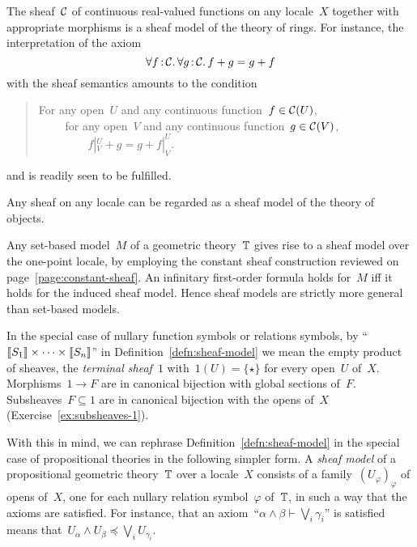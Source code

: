 \documentclass{ws-rv9x6}
\begin{document}
{\begin{example}The sheaf~$\mathcal{C}$ of continuous real-valued functions on any
locale~$X$ together with appropriate morphisms is a sheaf model of the theory
of rings. For instance, the interpretation of the axiom
\[ \forall f\,{:}\,\mathcal{C}\mathpunct{.} \forall g\,{:}\,\mathcal{C}\mathpunct{.} f + g = g + f \]
with the sheaf semantics amounts to the condition
\begin{quote}
For any open~$U$ and any continuous function~$f \in \mathcal{C}(U)$, \\
${\qquad}$ for any open~$V$ and any continuous function~$g \in \mathcal{C}(V)$, \\
${\qquad\qquad}$ $f|^U_V + g = g + f|^U_V$.
\end{quote}
and is readily seen to be fulfilled.
\end{example}

\begin{example}Any sheaf on any locale can be
regarded as a sheaf model of the theory of objects.\end{example}

\begin{example}\label{ex:sets-as-sheaf-models}
Any set-based model~$M$ of a geometric theory~$\mathbb{T}$ gives rise to a
sheaf model over the one-point locale, by employing the constant sheaf
construction reviewed on page~\ref{page:constant-sheaf}. An infinitary
first-order formula holds for~$M$ iff it holds for the induced sheaf model.
Hence sheaf models are strictly more general than set-based models.
\end{example}

In the special case of nullary function symbols or relations symbols, by
``${\llbracket{S_1}\rrbracket} \times \cdots \times {\llbracket{S_n}\rrbracket}$'' in
Definition~\ref{defn:sheaf-model} we mean the empty product of sheaves, the
\emph{terminal sheaf}~$1$ with~$1(U) = \{\star\}$ for every open~$U$ of~$X$.
Morphisms~$1 \to F$ are in canonical bijection with global sections of~$F$.
Subsheaves~$F \subseteq 1$ are in canonical bijection with the opens of~$X$
(Exercise~\ref{ex:subsheaves-1}).

With this in mind, we can rephrase Definition~\ref{defn:sheaf-model} in the
special case of propositional theories in the following simpler form. A
\emph{sheaf model} of a propositional geometric theory~$\mathbb{T}$ over a locale~$X$
consists of a family~$(U_\varphi)_\varphi$ of opens of~$X$, one for each
nullary relation symbol~$\varphi$ of~$\mathbb{T}$, in such a way that the axioms are
satisfied. For instance, that an axiom~``$\alpha \wedge \beta \vdash \bigvee_i
\gamma_i$'' is satisfied means that~$U_\alpha \wedge U_\beta \preceq \bigvee_i
U_{\gamma_i}$.

}
\end{document}
